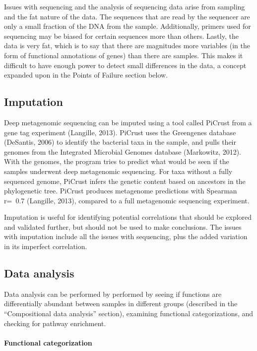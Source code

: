 Issues with sequencing and the analysis of sequencing data arise from sampling and the fat nature of the data. The sequences that are read by the sequencer are only a small fraction of the DNA from the sample. Additionally, primers used for sequencing may be biased for certain sequences more than others. Lastly, the data is very fat, which is to say that there are magnitudes more variables (in the form of functional annotations of genes) than there are samples. This makes it difficult to have enough power to detect small differences in the data, a concept expanded upon in the Points of Failure section below.

\FloatBarrier

\subsection{Imputation}
Deep metagenomic sequencing can be imputed using a tool called PiCrust from a gene tag experiment (Langille, 2013). PiCrust uses the Greengenes database (DeSantis, 2006) to identify the bacterial taxa in the sample, and pulls their genomes from the Integrated Microbial Genomes database (Markowitz, 2012). With the genomes, the program tries to predict what would be seen if the samples underwent deep metagenomic sequencing. For taxa without a fully sequenced genome, PiCrust infers the genetic content based on ancestors in the phylogenetic tree. PiCrust produces metagenome predictions with Spearman r=~0.7 (Langille, 2013), compared to a full metagenomic sequencing experiment.

Imputation is useful for identifying potential correlations that should be explored and validated further, but should not be used to make conclusions. The issues with imputation include all the issues with sequencing, plus the added variation in its imperfect correlation.

\subsection{Data analysis}
Data analysis can be performed by performed by seeing if functions are differentially abundant between samples in different groups (described in the “Compositional data analysis” section), examining functional categorizations, and checking for pathway enrichment.

\paragraph{Functional categorization}\mbox{}\\

